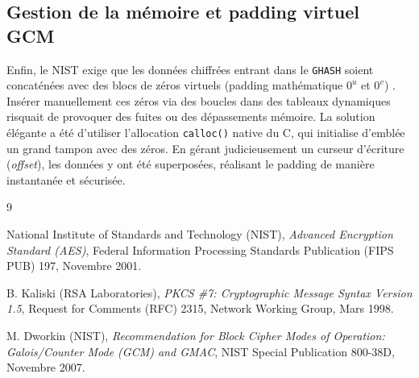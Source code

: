 \documentclass[12pt,a4paper]{article}
\begin{document}
\subsection{Gestion de la mémoire et padding virtuel GCM}
Enfin, le NIST exige que les données chiffrées entrant dans le \texttt{GHASH} soient concaténées avec des blocs de zéros virtuels (padding mathématique $0^u$ et $0^v$) \cite{sp80038d}. Insérer manuellement ces zéros via des boucles dans des tableaux dynamiques risquait de provoquer des fuites ou des dépassements mémoire. La solution élégante a été d'utiliser l'allocation \texttt{calloc()} native du C, qui initialise d'emblée un grand tampon avec des zéros. En gérant judicieusement un curseur d'écriture (\textit{offset}), les données y ont été superposées, réalisant le padding de manière instantanée et sécurisée.

\newpage
\renewcommand{\refname}{Bibliographie}
\begin{thebibliography}{9}

National Institute of Standards and Technology (NIST), 
\emph{Advanced Encryption Standard (AES)}, 
Federal Information Processing Standards Publication (FIPS PUB) 197, Novembre 2001.

B. Kaliski (RSA Laboratories), 
\emph{PKCS \#7: Cryptographic Message Syntax Version 1.5}, 
Request for Comments (RFC) 2315, Network Working Group, Mars 1998.

M. Dworkin (NIST),
\emph{Recommendation for Block Cipher Modes of Operation: Galois/Counter Mode (GCM) and GMAC},
NIST Special Publication 800-38D, Novembre 2007.

\end{thebibliography}
\end{document}
